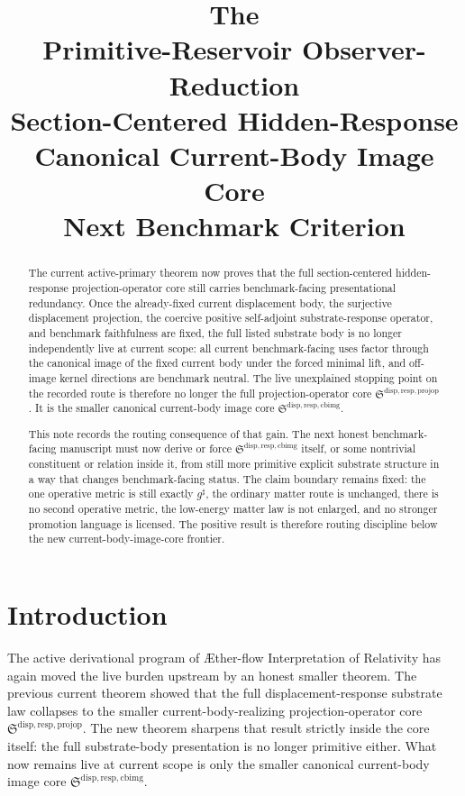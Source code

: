 \documentclass[11pt]{article}
\title{\textbf{The \TheoryName{}}\\[0.4em]
\large Primitive-Reservoir Observer-Reduction\\
\large Section-Centered Hidden-Response\\
\large Canonical Current-Body Image Core\\
\large Next Benchmark Criterion}
\author{}
\date{}
\newcommand{\Aflow}{\AE{}ther-flow}
\newcommand{\TheoryName}{\Aflow{} Interpretation of Relativity}
\newcommand{\CompletedMetric}{g^{\sharp}}
\newcommand{\ProjectionOperatorCore}{\mathfrak S^{\mathrm{disp,resp,projop}}}
\newcommand{\CurrentBodyImageCore}{\mathfrak S^{\mathrm{disp,resp,cbimg}}}
\begin{document}
\maketitle

\begin{abstract}
The current active-primary theorem now proves that the full section-centered hidden-response projection-operator core still carries benchmark-facing presentational redundancy. Once the already-fixed current displacement body, the surjective displacement projection, the coercive positive self-adjoint substrate-response operator, and benchmark faithfulness are fixed, the full listed substrate body is no longer independently live at current scope: all current benchmark-facing uses factor through the canonical image of the fixed current body under the forced minimal lift, and off-image kernel directions are benchmark neutral. The live unexplained stopping point on the recorded route is therefore no longer the full projection-operator core \(\ProjectionOperatorCore\). It is the smaller canonical current-body image core \(\CurrentBodyImageCore\).

This note records the routing consequence of that gain. The next honest benchmark-facing manuscript must now derive or force \(\CurrentBodyImageCore\) itself, or some nontrivial constituent or relation inside it, from still more primitive explicit substrate structure in a way that changes benchmark-facing status. The claim boundary remains fixed: the one operative metric is still exactly \(\CompletedMetric\), the ordinary matter route is unchanged, there is no second operative metric, the low-energy matter law is not enlarged, and no stronger promotion language is licensed. The positive result is therefore routing discipline below the new current-body-image-core frontier.
\end{abstract}

\section{Introduction}

The active derivational program of \TheoryName{} has again moved the live burden upstream by an honest smaller theorem. The previous current theorem showed that the full displacement-response substrate law collapses to the smaller current-body-realizing projection-operator core \(\ProjectionOperatorCore\). The new theorem sharpens that result strictly inside the core itself: the full substrate-body presentation is no longer primitive either. What now remains live at current scope is only the smaller canonical current-body image core \(\CurrentBodyImageCore\).
\end{document}
